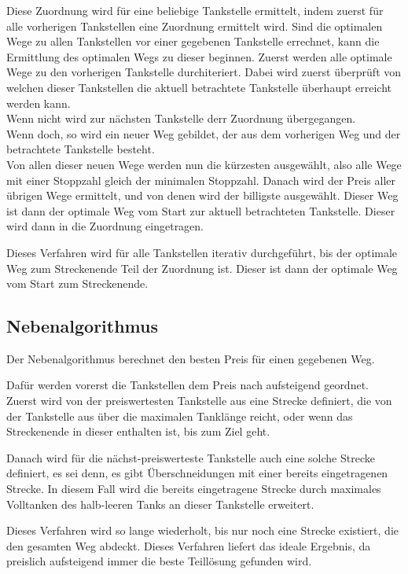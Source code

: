 \documentclass[a4paper,10pt,ngerman]{scrartcl}
\begin{document}
Diese Zuordnung wird für eine beliebige Tankstelle ermittelt, indem zuerst für alle vorherigen Tankstellen eine Zuordnung ermittelt wird. 
Sind die optimalen Wege zu allen Tankstellen vor einer gegebenen Tankstelle errechnet, kann die Ermittlung des optimalen Wegs zu dieser beginnen.
Zuerst werden alle optimale Wege zu den vorherigen Tankstelle durchiteriert. Dabei wird zuerst überprüft von welchen dieser Tankstellen die aktuell betrachtete Tankstelle überhaupt erreicht werden kann. \\
Wenn nicht wird zur nächsten Tankstelle derr Zuordnung übergegangen. \\
Wenn doch, so wird ein neuer Weg gebildet, der aus dem vorherigen Weg und der betrachtete Tankstelle besteht. \\
Von allen dieser neuen Wege werden nun die kürzesten ausgewählt, also alle Wege mit einer Stoppzahl gleich der minimalen Stoppzahl. Danach wird der Preis aller übrigen Wege ermittelt, und von denen wird der billigste ausgewählt. Dieser Weg ist dann der optimale Weg vom Start zur aktuell betrachteten Tankstelle. Dieser wird dann in die Zuordnung eingetragen.

Dieses Verfahren wird für alle Tankstellen iterativ durchgeführt, bis der optimale Weg zum Streckenende Teil der Zuordnung ist. Dieser ist dann der optimale Weg vom Start zum Streckenende.

\subsection{Nebenalgorithmus}

Der Nebenalgorithmus berechnet den besten Preis für einen gegebenen Weg. 

Dafür werden vorerst die Tankstellen dem Preis nach aufsteigend geordnet. Zuerst wird von der preiswertesten Tankstelle aus eine Strecke definiert, die von der Tankstelle aus über die maximalen Tanklänge reicht, oder wenn das Streckenende in dieser enthalten ist, bis zum Ziel geht.

Danach wird für die nächst-preiswerteste Tankstelle auch eine solche Strecke definiert, es sei denn, es gibt Überschneidungen mit einer bereits eingetragenen Strecke. In diesem Fall wird die bereits eingetragene Strecke durch maximales Volltanken des halb-leeren Tanks an dieser Tankstelle erweitert.

Dieses Verfahren wird so lange wiederholt, bis nur noch eine Strecke existiert, die den gesamten Weg abdeckt. Dieses Verfahren liefert das ideale Ergebnis, da preislich aufsteigend immer die beste Teillösung gefunden wird. 
\end{document}

